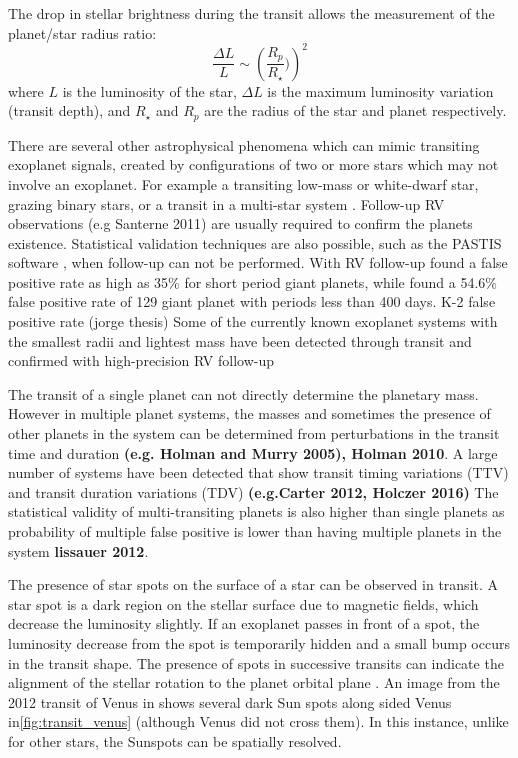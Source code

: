 The drop in stellar brightness during the transit allows the measurement of the planet/star radius ratio:
\begin{equation}
    \frac{\Delta L}{L} \sim \left(\frac{R_p}{R_{\star}})\right)^2
\end{equation}
where \(L\) is the luminosity of the star, \(\Delta L\) is the maximum luminosity variation (transit depth), and \(R_{\star}\) and \(R_p\) are the radius of the star and planet respectively.


There are several other astrophysical phenomena which can mimic transiting exoplanet signals, created by configurations of two or more stars which may not involve an exoplanet. 
For example a transiting low-mass or white-dwarf star, grazing binary stars, or a transit in a multi-star system \citep[e.g.][]{Cameron 2012, Santerne 2013}.
Follow-up RV observations (e.g Santerne 2011) are usually required to confirm the planets existence. 
Statistical validation techniques are also possible, such as the PASTIS software \cite{diaz2014}, when follow-up can not be performed.
With RV follow-up \citet{santerne_sophie_2012} found a false positive rate as high as 35\% for short period giant planets, while \citet{santerne_2016} found a 54.6\% false positive rate of 129 giant planet with periods less than 400 days. K-2 false positive rate (jorge thesis)
Some of the currently known exoplanet systems with the smallest radii and lightest mass have been detected through transit and confirmed with high-precision RV follow-up \citet[e.g.]{ queloz 2009, pepe 2013, lopex-morales 2016, santerne 2018?}

The transit of a single planet can not directly determine the planetary mass.
However in multiple planet systems, the masses and sometimes the presence of other planets in the system can be determined from perturbations in the transit time and duration \textbf{(e.g. Holman and Murry 2005), Holman 2010}.
A large number of systems have been detected that show transit timing variations (TTV) and transit duration variations (TDV) \textbf{(e.g.Carter 2012, Holczer 2016)}
The statistical validity of multi-transiting planets is also higher than single planets as probability of multiple false positive is lower than having multiple planets in the system \textbf{lissauer 2012}.

The presence of star spots on the surface of a star can be observed in transit.
A star spot is a dark region on the stellar surface due to magnetic fields, which decrease the luminosity slightly.
If an exoplanet passes in front of a spot, the luminosity decrease from the spot is temporarily hidden and a small bump occurs in the transit shape.
The presence of spots in successive transits can indicate the alignment of the stellar rotation to the planet orbital plane \citet{Sanchis-Ojeda et al 2012}.
An image from the 2012 transit of Venus in shows several dark Sun spots along sided Venus in\ref{fig:transit_venus} (although Venus did not cross them).
In this instance, unlike for other stars, the Sunspots can be spatially resolved.

